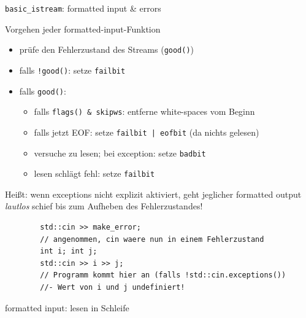 \begin{frame}[fragile]{\texttt{basic\_istream}: formatted input \& errors}
	\begin{block}{Vorgehen jeder formatted-input-Funktion}
		\begin{itemize}
			\item prüfe den Fehlerzustand des Streams (\texttt{good()})
			\item falls \texttt{!good()}: setze \texttt{failbit}
			\item falls \texttt{good()}:
				\begin{itemize}
					\item falls \texttt{flags() \& skipws}: entferne white-spaces vom Beginn
					\item falls jetzt EOF: setze \texttt{failbit | eofbit} (da nichts gelesen)
					\item versuche zu lesen; bei exception: setze \texttt{badbit}
					\item lesen schlägt fehl: setze \texttt{failbit}
				\end{itemize}
		\end{itemize}
	\end{block}
	
	\pause
	
	\footnotesize
	
	Heißt: wenn exceptions nicht explizit aktiviert, geht jeglicher formatted output \emph{lautlos} schief bis zum Aufheben des Fehlerzustandes!
	
	\begin{lstlisting}
		std::cin >> make_error;
		// angenommen, cin waere nun in einem Fehlerzustand
		int i; int j;
		std::cin >> i >> j;
		// Programm kommt hier an (falls !std::cin.exceptions())
		//- Wert von i und j undefiniert!
	\end{lstlisting}
\end{frame}

\begin{frame}[t]{formatted input: lesen in Schleife}
	\begin{columns}[t]
		\hspace{2em}
			\onslide*<+> {  }
			\onslide<+-> {  }
			
		\column{0.5\textwidth}
			\vspace{2.25em}
			\onslide*<+> {  }
			\onslide<+-> {  }
	\end{columns}
\end{frame}

